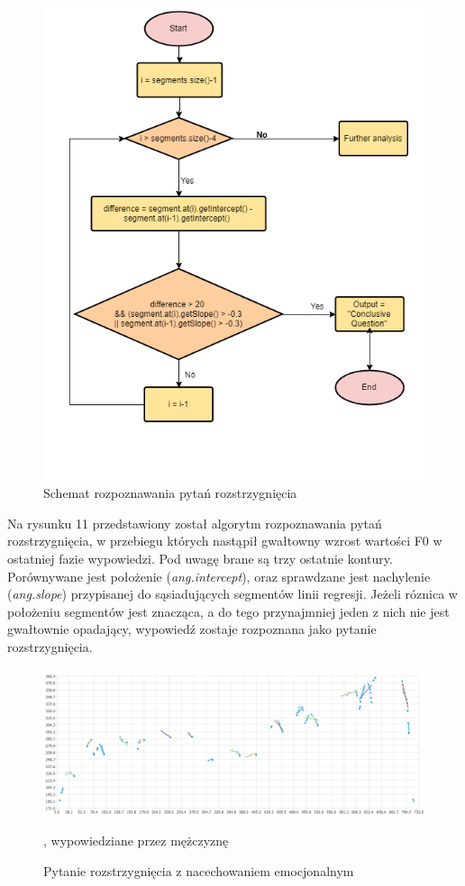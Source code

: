 \documentclass[a4paper,12 pt]{report}
\begin{document}
\begin{figure}[h]
\centering
\includegraphics[scale=1.0]{conclusive.png}
\caption{Schemat rozpoznawania pytań rozstrzygnięcia}
\end{figure}
\FloatBarrier
Na rysunku 11 przedstawiony został algorytm rozpoznawania pytań rozstrzygnięcia, w przebiegu których nastąpił gwałtowny wzrost wartości F0 w ostatniej fazie wypowiedzi. Pod uwagę brane są trzy ostatnie kontury. Porównywane jest położenie  (\textit{ang.intercept}), oraz sprawdzane jest nachylenie (\textit{ang.slope}) przypisanej do sąsiadujących segmentów linii regresji. Jeżeli róznica w położeniu segmentów jest znacząca, a do tego przynajmniej jeden z nich nie jest gwałtownie opadający, wypowiedź zostaje rozpoznana jako pytanie rozstrzygnięcia.
 \FloatBarrier
\begin{figure}[h]
\centering
\includegraphics[scale=0.6]{pytanie_rozstrzygniecia_2_emocje.png}
\caption{Pytanie rozstrzygnięcia z nacechowaniem emocjonalnym}, wypowiedziane przez mężczyznę
\end{figure}
\end{document}
